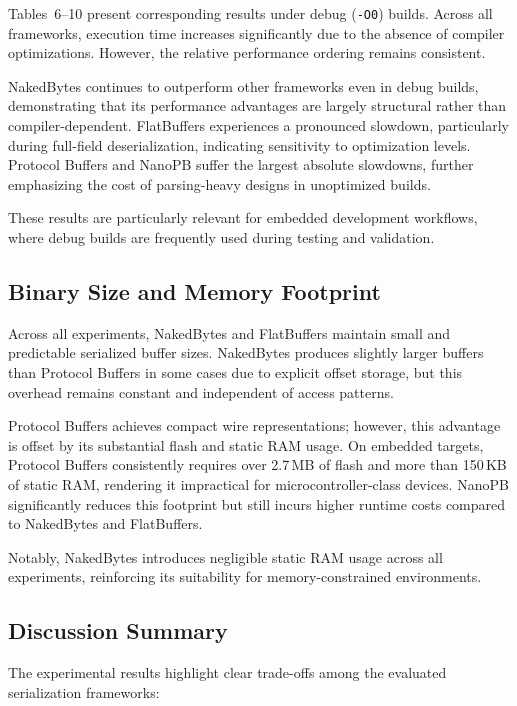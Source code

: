 \documentclass[11pt, a4paper]{article}
\begin{document}
Tables~6–10 present corresponding results under debug (\texttt{-O0}) builds. Across all frameworks, execution time increases significantly due to the absence of compiler optimizations. However, the relative performance ordering remains consistent.

NakedBytes continues to outperform other frameworks even in debug builds, demonstrating that its performance advantages are largely structural rather than compiler-dependent. FlatBuffers experiences a pronounced slowdown, particularly during full-field deserialization, indicating sensitivity to optimization levels. Protocol Buffers and NanoPB suffer the largest absolute slowdowns, further emphasizing the cost of parsing-heavy designs in unoptimized builds.

These results are particularly relevant for embedded development workflows, where debug builds are frequently used during testing and validation.

\subsection{Binary Size and Memory Footprint}

Across all experiments, NakedBytes and FlatBuffers maintain small and predictable serialized buffer sizes. NakedBytes produces slightly larger buffers than Protocol Buffers in some cases due to explicit offset storage, but this overhead remains constant and independent of access patterns.

Protocol Buffers achieves compact wire representations; however, this advantage is offset by its substantial flash and static RAM usage. On embedded targets, Protocol Buffers consistently requires over 2.7\,MB of flash and more than 150\,KB of static RAM, rendering it impractical for microcontroller-class devices. NanoPB significantly reduces this footprint but still incurs higher runtime costs compared to NakedBytes and FlatBuffers.

Notably, NakedBytes introduces negligible static RAM usage across all experiments, reinforcing its suitability for memory-constrained environments.

\subsection{Discussion Summary}

The experimental results highlight clear trade-offs among the evaluated serialization frameworks:
\end{document}
